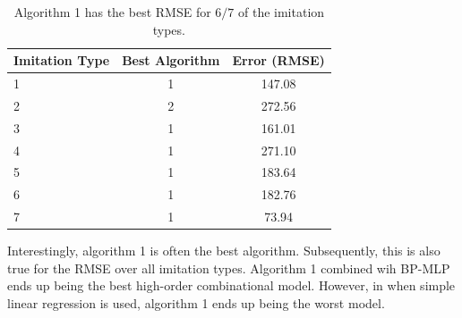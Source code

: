 \begin{table}[center]
	\centering
	\begin{center}
		\begin{tabular}{|l|c|c|} \hline
			\textbf{Imitation Type}	& \textbf{Best Algorithm}	&	\textbf{Error (RMSE)}	\\ \hline \hline
			1						& 1							&	147.08					\\ \hline
			2						& 2							&	272.56					\\ \hline
			3						& 1							&	161.01					\\ \hline
			4						& 1							&	271.10					\\ \hline
			5						& 1							&	183.64					\\ \hline
			6						& 1							&	182.76					\\ \hline
			7						& 1							&	73.94					\\ \hline
		\end{tabular}
	\end{center}
	\caption{Algorithm 1 has the best RMSE for $6/7$ of the imitation types.}
	\label{tab:best-for-each}
\end{table}

Interestingly, algorithm 1 is often the best algorithm. Subsequently, this is also true for the RMSE over all imitation types. Algorithm 1 combined wih BP-MLP ends up being the best high-order combinational model. However, in when simple linear regression is used, algorithm 1 ends up being the worst model.